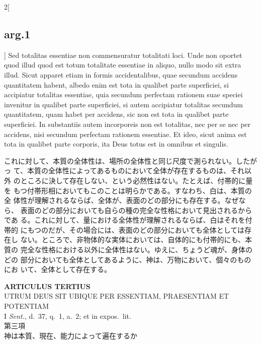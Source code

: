 \documentclass[paper=a4paper,fontsize=10pt,jafontsize=9pt,titlepage]{jlreq}
\begin{document}
\begin{paracol}{2}[\subsection{arg.1}]
Sed totalitas essentiae non commensuratur totalitati loci. Unde
 non oportet quod illud quod est totum totalitate essentiae in aliquo,
 nullo modo sit extra illud. Sicut apparet etiam in formis
 accidentalibus, quae secundum accidens quantitatem habent, albedo enim
 est tota in qualibet parte superficiei, si accipiatur totalitas
 essentiae, quia secundum perfectam rationem suae speciei invenitur in
 qualibet parte superficiei, si autem accipiatur totalitas secundum
 quantitatem, quam habet per accidens, sic non est tota in qualibet
 parte superficiei. In substantiis autem incorporeis non est totalitas,
 nec per se nec per accidens, nisi secundum perfectam rationem
 essentiae. Et ideo, sicut anima est tota in qualibet parte corporis,
 ita Deus totus est in omnibus et singulis.

\switchcolumn

これに対して、本質の全体性は、場所の全体性と同じ尺度で測られない。したがっ
 て、本質の全体性によってあるものにおいて全体が存在するものは、それ以外
 のところに決して存在しない、という必然性はない。たとえば、付帯的に量を
 もつ付帯形相においてもこのことは明らかである。すなわち、白は、本質の全
 体性が理解されるならば、全体が、表面のどの部分にも存在する。なぜなら、
 表面のどの部分においても自らの種の完全な性格において見出されるからであ
 る。これに対して、量における全体性が理解されるならば、白はそれを付帯的
 にもつのだが、その場合には、表面のどの部分においても全体としては存在し
 ない。ところで、非物体的な実体においては、自体的にも付帯的にも、本質の
 完全な性格における以外に全体性はない。ゆえに、ちょうど魂が、身体のどの
 部分においても全体としてあるように、神は、万物において、個々のものにお
 いて、全体として存在する。

\end{paracol}
\newpage
{} 

\begin{center}
 {\Large {\bfseries ARTICULUS TERTIUS}}\\
 {\large UTRUM DEUS SIT UBIQUE PER ESSENTIAM, PRAESENTIAM ET POTENTIAM}\\
 {\footnotesize I {\itshape Sent.}, d.~37, q.~1, a.~2; et in expos.~lit.}\\
 {\Large 第三項\\神は本質、現在、能力によって遍在するか}
\end{center}

{}
\setcounter{section}{3}
\setcounter{subsection}{0}
\end{document}
